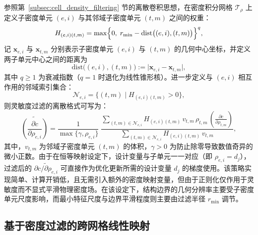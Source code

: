 参照第~\ref{subsec:cell_density_filtering} 节的离散卷积思想，在密度积分网格 $\mathcal{T}_\rho$ 上定义子密度单元 $(e,i)$ 与其邻域子密度单元 $(t,m)$ 之间的权重：
\[
H_{(e,i)(t,m)} = \max\Bigl\{0,\; r_{\min} - \mathrm{dist}\bigl((e,i), (t,m)\bigr)\Bigr\}^q,
\]
记 $\boldsymbol{x}_{e,i}$ 与 $\boldsymbol{x}_{t,m}$ 分别表示子密度单元 $(e,i)$ 与 $(t,m)$ 的几何中心坐标，并定义两子单元中心之间的距离为
\[
\mathrm{dist}\bigl((e,i), (t,m)\bigr) := \vert\boldsymbol{x}_{e,i} - \boldsymbol{x}_{t,m}\vert,
\]
其中 $q \geq 1$ 为衰减指数（$q=1$ 时退化为线性锥形核）。进一步定义与 $(e,i)$ 相互作用的邻域索引集合：
\[
\mathcal{N}_{e,i} = \{(t,m) \mid H_{(e,i)(t,m)} > 0\},
\]
则灵敏度过滤的离散格式可写为：
\begin{equation} \label{eq:ch4_mtop_sens_filter}
	\widetilde{\left(\frac{\partial c}{\partial \rho_{e,i}}\right)} = \frac{1}{\max\{\gamma, \rho_{e,i}\}}\; \frac{\sum\limits_{(t,m)\in\mathcal{N}_{e,i}} H_{(e,i)(t,m)}\, v_{t,m}\,\rho_{t,m}\, \left(\frac{\partial c}{\partial \rho_{t,m}}\right)} {\sum\limits_{(t,m)\in\mathcal{N}_{e,i}} H_{(e,i)(t,m)}\, v_{t,m}},
\end{equation}
其中，$v_{t,m}$ 为邻域子密度单元 $(t,m)$ 的体积，$\gamma>0$ 为防止除零导致数值奇异的微小正数。由于在恒等映射设定下，设计变量与子单元一一对应（即 $\rho_{e,i} = d_j$），过滤后的 $\widetilde{\partial c/\partial \rho_{e,i}}$ 可直接作为优化更新所需的设计变量 $d_j$ 的梯度使用。该策略实现简单、计算开销低，且无需引入额外的密度映射变量，但由于正则化仅作用于灵敏度而不显式平滑物理密度场。在该设定下，结构边界的几何分辨率主要受子密度单元尺度影响，而最小特征尺度与边界平滑程度则主要由过滤半径 $r_{\min}$ 调节。


\subsection{基于密度过滤的跨网格线性映射}
\label{subsec:mapping_density_linear}

